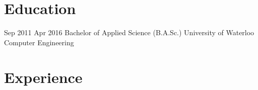 \documentclass[print]{friggeri-cv} %
\begin{document}
\section{Education}

\begin{entrylist}


\entry
{Sep 2011}
{Apr 2016}
{Bachelor of Applied Science (B.A.Sc.)}
{University of Waterloo}
{Computer Engineering}


\end{entrylist}


\section{Experience}
\end{document}
